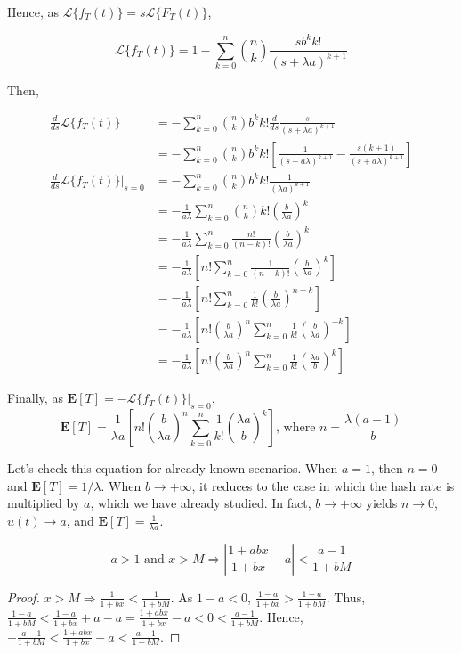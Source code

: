 Hence, as $\mathcal{L}\{f_T(t)\} = s \mathcal{L}\{F_T(t)\}$,

$$\mathcal{L}\{f_T(t)\} = 1 - \sum_{k=0}^n \binom{n}{k} \frac{s b^k k!}{(s+\lambda a)^{k+1}}$$

Then,

\begin{align*}
\frac{d}{ds} \mathcal{L}\{f_T(t)\}
	&= - \sum_{k=0}^n \binom{n}{k} b^k k! \frac{d}{ds} \frac{s}{(s+\lambda a)^{k+1}} \\
	&= - \sum_{k=0}^n \binom{n}{k} b^k k! \left[ \frac{1}{(s+a\lambda)^{k+1}} - \frac{s(k+1)}{(s+a \lambda)^{k+1}} \right] \\
\frac{d}{ds} \mathcal{L}\{f_T(t)\}|_{s=0}
	&= - \sum_{k=0}^n \binom{n}{k} b^k k! \frac{1}{(\lambda a)^{k+1}} \\
	&= - \frac{1}{a\lambda} \sum_{k=0}^n \binom{n}{k} k! \left( \frac{b}{\lambda a} \right)^k \\
	&= - \frac{1}{a\lambda} \sum_{k=0}^n \frac{n!}{(n-k)!} \left( \frac{b}{\lambda a} \right)^k \\
	&= - \frac{1}{a\lambda} \left[ n! \sum_{k=0}^n \frac{1}{(n-k)!} \left( \frac{b}{\lambda a} \right)^k \right] \\
	&= - \frac{1}{a\lambda} \left[ n! \sum_{k=0}^n \frac{1}{k!} \left( \frac{b}{\lambda a} \right)^{n-k} \right] \tag{$k \rightarrow n-k$} \\
	&= - \frac{1}{a\lambda} \left[ n! \left(\frac{b}{\lambda a}\right)^n \sum_{k=0}^n \frac{1}{k!} \left( \frac{b}{\lambda a} \right)^{-k} \right] \\
	&= - \frac{1}{a\lambda} \left[ n! \left(\frac{b}{\lambda a}\right)^n \sum_{k=0}^n \frac{1}{k!} \left( \frac{\lambda a}{b} \right)^{k} \right]
\end{align*}

Finally, as $\mathbf{E}[T] = -\mathcal{L}\{f_T(t)\}|_{s=0}$,
$$\mathbf{E}[T] = \frac{1}{\lambda a} \left[ n! \left(\frac{b}{\lambda a}\right)^n \sum_{k=0}^n \frac{1}{k!} \left( \frac{\lambda a}{b} \right)^{k} \right] \text{, where $n = \frac{\lambda(a-1)}{b}$}$$

Let's check this equation for already known scenarios. When $a=1$, then $n=0$ and $\mathbf{E}[T] = 1/\lambda$. When $b \rightarrow +\infty$, it reduces to the case in which the hash rate is multiplied by $a$, which we have already studied. In fact, $b \rightarrow +\infty$ yields $n \rightarrow 0$, $u(t) \rightarrow a$, and $\mathbf{E}[T] = \frac{1}{\lambda a}$.

\begin{theorem}
	$$a > 1 \text{ and } x > M \Rightarrow \left| \frac{1+abx}{1+bx} - a \right| < \frac{a-1}{1+bM}$$
\end{theorem}
\begin{proof}
$x > M \Rightarrow \frac{1}{1+bx} < \frac{1}{1+bM}$. As $1-a<0$, $\frac{1-a}{1+bx} > \frac{1-a}{1+bM}$. Thus, $\frac{1-a}{1+bM} < \frac{1-a}{1+bx} + a - a = \frac{1+abx}{1+bx} - a < 0 < \frac{a-1}{1+bM}$. Hence, $-\frac{a-1}{1+bM} < \frac{1+abx}{1+bx} - a < \frac{a-1}{1+bM}$.
\end{proof}

